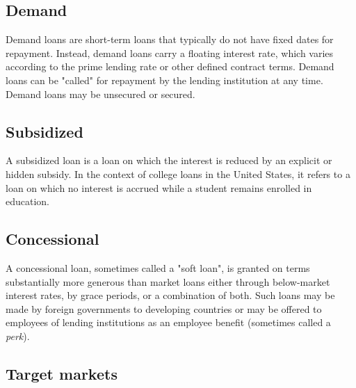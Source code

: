 \subsection{Demand}
\label{sss:dema-849d}




Demand loans are short-term loans that typically do not have fixed dates for repayment.
Instead, demand loans carry a floating interest rate, which varies according to the prime
lending rate or other defined contract terms. Demand loans can be "called" for repayment
by the lending institution at any time. Demand loans may be unsecured or secured.




\subsection{Subsidized}
\label{sss:subs-07b0}




A subsidized loan is a loan on which the interest is reduced by an explicit or hidden
subsidy. In the context of college loans in the United States, it refers to a loan on
which no interest is accrued while a student remains enrolled in education.




\subsection{Concessional}
\label{sss:conc-4ca4}




A concessional loan, sometimes called a "soft loan", is granted on terms substantially
more generous than market loans either through below-market interest rates, by grace
periods, or a combination of both. Such loans may be made by foreign governments to
developing countries or may be offered to employees of lending institutions as an employee
benefit (sometimes called a \textit{perk}).




\subsection{Target markets}
\label{sss:targ-8f54}




